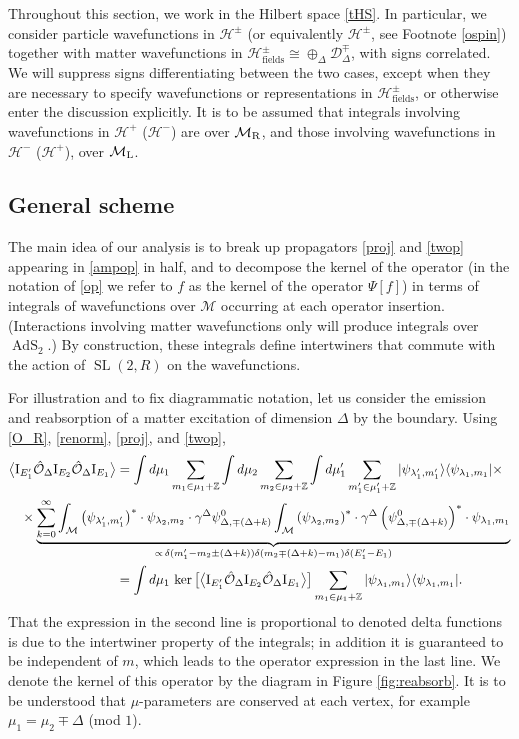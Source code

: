 \documentclass[12pt]{article}
\newcommand{\nn}{\nonumber\\}
\newcommand{\blangle}{\bigl\langle}
\newcommand{\brangle}{\bigr\rangle}
\newcommand*{\bra}[1]{\langle{#1}|}
\newcommand*{\ket}[1]{|{#1}\rangle}
\newcommand*{\bcorr}[1]{\blangle{#1}\brangle}
\newcommand{\calD}{\mathcal{D}}
\newcommand{\calH}{\mathcal{H}}
\newcommand{\calM}{\mathcal{M}}
\newcommand{\calO}{\mathcal{O}}
\newcommand{\ZZ}{\mathbb{Z}}
\newcommand{\RR}{\mathbb{R}}
\DeclareMathOperator{\tSL}{\widetilde{\mathrm{SL}}}
\DeclareMathOperator{\tAdS}{\widetilde{AdS}}
\newcommand{\Iota}{\mathrm{I}}
\newcommand{\lam}{\lambda}
\newcommand{\ga}{\gamma}
\newcommand{\de}{\delta}
\newcommand{\De}{\Delta}
\def\widetilde#1{#1}%
\def\RR{R}
\begin{document}
Throughout this section, we work in the Hilbert space \eqref{tHS}. In particular, we consider particle wavefunctions in $\calH^{\pm}$ (or equivalently $\widetilde{\calH}^{\pm}$, see Footnote \ref{ospin})  together with matter wavefunctions in $\calH_{\text{fields}}^{\pm}\cong \oplus_{\De}\calD^{\mp}_{\De}$, with signs correlated. We will suppress signs differentiating between the two cases, except when they are necessary to specify wavefunctions or representations in $\calH_{\text{fields}}^{\pm}$, or otherwise enter the discussion explicitly. It is to be assumed that integrals involving wavefunctions in $\calH^{+}$ ($\widetilde{\calH}^-$) are over $\calM_{\rm R}$, and those involving wavefunctions in $\calH^{-}$ ($\widetilde{\calH}^+$), over $\calM_{\rm L}$. 

\subsection{General scheme} \label{sec:scheme}

The main idea of our analysis is to break up propagators \eqref{proj} and \eqref{twop} appearing in \eqref{ampop} in half, and to decompose the kernel of the operator (in the notation of \eqref{op} we refer to $f$ as the kernel of the operator $\Psi[f]$) in terms of integrals of wavefunctions over $\calM$ occurring at each operator insertion. (Interactions involving matter wavefunctions only will produce integrals over $\tAdS_2$.) By construction, these integrals define intertwiners that commute with the action of $\tSL(2,\RR)$ on the wavefunctions.


For illustration and to fix diagrammatic notation, let us consider the emission and reabsorption of a matter excitation of dimension $\De$ by the boundary. Using \eqref{O_R}, \eqref{renorm}, \eqref{proj}, and \eqref{twop}, 
\begin{align}
\bcorr{\Iota_{E_1'}\hat{\calO}_{\De}\Iota_{E_2}\hat{\calO}_{\De} \Iota_{E_1}}&=\int d\mu_1 \sum_{m_1\in \mu_1 +\ZZ}\int d\mu_2\sum_{m_2 \in \mu_2+\ZZ}\int d\mu'_1 \sum_{m'_1 \in \mu'_1+\ZZ}\ket{\psi_{\lam'_1, m'_1}}\bra{\psi_{\lam_1,m_1}} \times \nn
&\hskip-1in \times \underbrace{\sum_{k=0}^{\infty}\int_{\calM}\left(\psi_{\lam'_1, m'_1}\right)^*\cdot \psi_{\lam_2, m_2}\cdot\ga^{\De}\psi^{0}_{\De,\mp( \De+k)}\int_{\calM}\left(\psi_{\lam_2, m_2}\right)^*\cdot\ga^{\De}\left(\psi^{0}_{\De, \mp(\De+k)}\right)^*\cdot \psi_{\lam_1,m_1} }_{\propto\, \de(m'_1-m_2\pm (\De+k))\de(m_2\mp(\De+k)-m_1)\de(E'_1-E_1)} \nn
&=\int d\mu_1\, \ker\big[\bcorr{\Iota_{E'_1}\hat{\calO}_{\De}\Iota_{E_2}\hat{\calO}_{\De} \Iota_{E_1}}\big]\sum_{m_1 \in \mu_1+\ZZ} \ket{\psi_{\lam_1, m_1}}\bra{\psi_{\lam_1,m_1}}.
\end{align}
That the expression in the second line is proportional to denoted delta functions is due to the intertwiner property of the integrals; in addition it is guaranteed to be independent of $m$, which leads to the operator expression in the last line. We denote the kernel of this operator by the diagram in Figure \ref{fig:reabsorb}. It is to be understood that $\mu$-parameters are conserved at each vertex, for example $\mu_1=\mu_2 \mp \Delta$ (mod $1$). 
\end{document}
